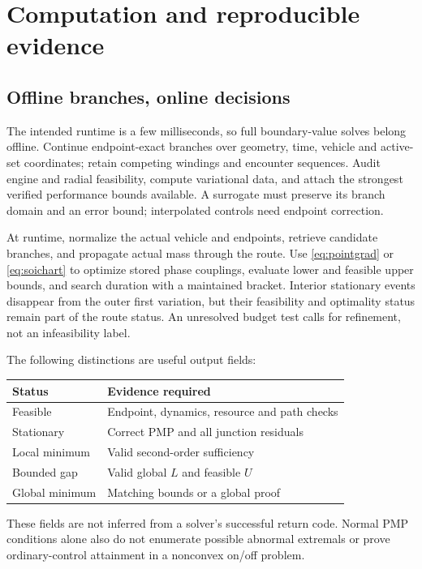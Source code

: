 \section{Computation and reproducible evidence}
\label{sec:computation}
\subsection{Offline branches, online decisions}
The intended runtime is a few milliseconds, so full boundary-value
solves belong offline. Continue endpoint-exact branches over geometry,
time, vehicle and active-set coordinates; retain competing windings
and encounter sequences. Audit engine and radial feasibility, compute
variational data, and attach the strongest verified performance bounds
available. A surrogate must preserve its branch domain and an error
bound; interpolated controls need endpoint correction.

At runtime, normalize the actual vehicle and endpoints, retrieve
candidate branches, and propagate actual mass through the route.
Use \eqref{eq:pointgrad} or \eqref{eq:soichart} to optimize stored
phase couplings, evaluate lower and feasible upper bounds, and search
duration with a maintained bracket. Interior stationary events disappear
from the outer first variation, but their feasibility and optimality
status remain part of the route status.
An unresolved budget test calls for refinement, not an infeasibility label.

The following distinctions are useful output fields:
\begin{center}
\small
\begin{tabular}{@{}p{}p{}@{}}
\toprule
Status & Evidence required\\\midrule
Feasible & Endpoint, dynamics, resource and path checks\\
Stationary & Correct PMP and all junction residuals\\
Local minimum & Valid second-order sufficiency\\
Bounded gap & Valid global $L$ and feasible $U$\\
Global minimum & Matching bounds or a global proof\\
\bottomrule
\end{tabular}
\end{center}
These fields are not inferred from a solver's successful return code.
Normal PMP conditions alone also do not enumerate possible abnormal
extremals or prove ordinary-control attainment in a nonconvex on/off
problem.

